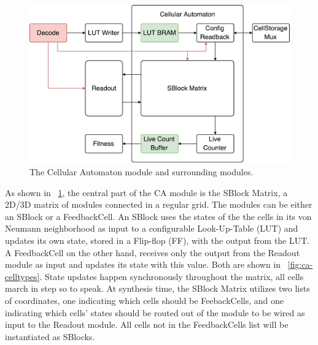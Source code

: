 \begin{figure}[ht]
  \centering
  \includegraphics[width=0.8\linewidth]{fig/ca-io}
  \caption{The Cellular Automaton module and surrounding modules.}
  \label{fig:ca-io}
\end{figure}

As shown in \figurename~\ref{fig:ca-io}, the central part of the CA module is
the SBlock Matrix, a 2D/3D matrix of modules connected in a regular grid. The
modules can be either an SBlock or a FeedbackCell. An SBlock uses the states of
the the cells in its von Neumann neighborhood as input to a configurable
Look-Up-Table (LUT) and updates its own state, stored in a Flip-flop (FF), with
the output from the LUT. A FeedbackCell on the other hand, receives only the
output from the Readout module as input and updates its state with this value.
Both are shown in \figurename~\ref{fig:ca-celltypes}. State updates happen
synchronously throughout the matrix, all cells march in step so to speak. At
synthesis time, the SBlock Matrix utilizes two lists of coordinates, one
indicating which cells should be FeebackCells, and one indicating which cells'
states should be routed out of the module to be wired as input to the Readout
module. All cells not in the FeedbackCells list will be instantiated as SBlocks.

